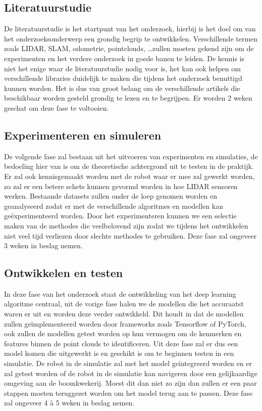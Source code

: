 \subsection{Literatuurstudie}

De literatuurstudie is het startpunt van het onderzoek, hierbij is het doel om van het onderzoeksonderwerp een grondig begrip te ontwikkelen.
Verschillende termen zoals LIDAR, SLAM, odometrie, pointclouds, \ldots zullen moeten gekend zijn om de experimenten en het verdere onderzoek in goede banen te leiden.
De kennis is niet het enige waar de literatuurstudie nodig voor is, het kan ook helpen om verschillende libraries duidelijk te maken die tijdens het onderzoek benuttigd kunnen worden.
Het is dus van groot belang om de verschillende artikels die beschikbaar worden gesteld grondig te lezen en te begrijpen.
Er worden 2 weken geschat om deze fase te voltooien.

\subsection{Experimenteren en simuleren}

De volgende fase zal bestaan uit het uitvoeren van experimenten en simulaties, de bedoeling hier van is om de theoretische achtergrond uit te testen in de praktijk.
Er zal ook kennisgemaakt worden met de robot waar er mee zal gewerkt worden, zo zal er een betere schets kunnen gevormd worden in hoe LIDAR sensoren werken.
Bestaande datasets zullen onder de loep genomen worden en geanalyseerd zodat er met de verschillende algoritmes en modellen kan geëxperimenteerd worden.
Door het experimenteren kunnen we een selectie maken van de methodes die veelbelovend zijn zodat we tijdens het ontwikkelen niet veel tijd verliezen door slechte methodes te gebruiken.
Deze fase zal ongeveer 3 weken in beslag nemen.

\subsection{Ontwikkelen en testen}

In deze fase van het onderzoek staat de ontwikkeling van het deep learning algoritme centraal, uit de vorige fase halen we de modellen die het accuraatst waren er uit en worden deze verder ontwikkeld.
Dit houdt in dat de modellen zullen geïmplementeerd worden door frameworks zoals Tensorflow of PyTorch, ook zullen de modellen getest worden op hun vermogen om de kenmerken en features binnen de point clouds te identificeren.
Uit deze fase zal er dus een model komen die uitgewerkt is en geschikt is om te beginnen testen in een simulatie.
De robot in de simulatie zal met het model geïntegreerd worden en er zal getest worden of de robot in de simulatie kan navigeren door een gelijkaardige omgeving aan de boomkwekerij.
Moest dit dan niet zo zijn dan zullen er een paar stappen moeten teruggezet worden om het model terug aan te passen.
Deze fase zal ongeveer 4 à 5 weken in beslag nemen.


